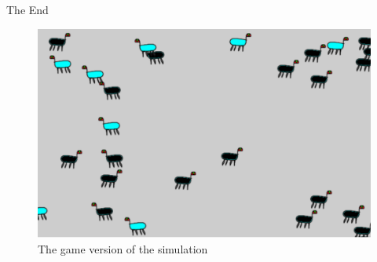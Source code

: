 \documentclass[xcolor=x11names, svgnames, rgb]{beamer}
\begin{document}
\begin{frame}[t]{The End}
	
\begin{center}
	\begin{figure}
		\includegraphics[width=0.9\linewidth]{gamePic.png} 
		\caption{The game version of the simulation}
\end{figure}	
\end{center}	

\end{frame}
\end{document}

